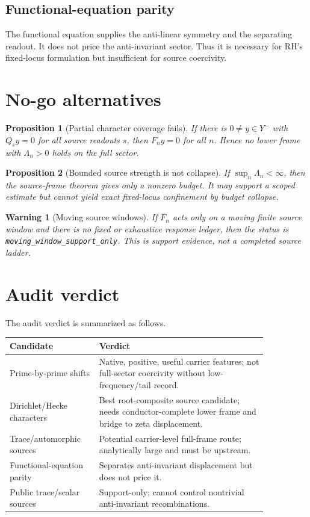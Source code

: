 \documentclass[11pt]{article}
\newtheorem{proposition}{Proposition}
\newtheorem{warning}{Warning}
\begin{document}
\subsection{Functional-equation parity}
The functional equation supplies the anti-linear symmetry and the separating readout.  It does not price the anti-invariant sector.  Thus it is necessary for RH's fixed-locus formulation but insufficient for source coercivity.

\section{No-go alternatives}
\begin{proposition}[Partial character coverage fails]
If there is \(0\ne y\in Y^-\) with \(Q_sy=0\) for all source readouts \(s\), then \(F_ny=0\) for all \(n\).  Hence no lower frame with \(\Lambda_n>0\) holds on the full sector.
\end{proposition}

\begin{proposition}[Bounded source strength is not collapse]
If \(\sup_n\Lambda_n<\infty\), then the source-frame theorem gives only a nonzero budget.  It may support a scoped estimate but cannot yield exact fixed-locus confinement by budget collapse.
\end{proposition}

\begin{warning}[Moving source windows]
If \(F_n\) acts only on a moving finite source window and there is no fixed or exhaustive response ledger, then the status is \texttt{moving\_window\_support\_only}.  This is support evidence, not a completed source ladder.
\end{warning}

\section{Audit verdict}
The audit verdict is summarized as follows.
\begin{center}
\begin{tabular}{p{0.27\linewidth}p{0.58\linewidth}}
\toprule
Candidate & Verdict\\
\midrule
Prime-by-prime shifts & Native, positive, useful carrier features; not full-sector coercivity without low-frequency/tail record.\\
Dirichlet/Hecke characters & Best root-composite source candidate; needs conductor-complete lower frame and bridge to zeta displacement.\\
Trace/automorphic sources & Potential carrier-level full-frame route; analytically large and must be upstream.\\
Functional-equation parity & Separates anti-invariant displacement but does not price it.\\
Public trace/scalar sources & Support-only; cannot control nontrivial anti-invariant recombinations.\\
\bottomrule
\end{tabular}
\end{center}
\end{document}
